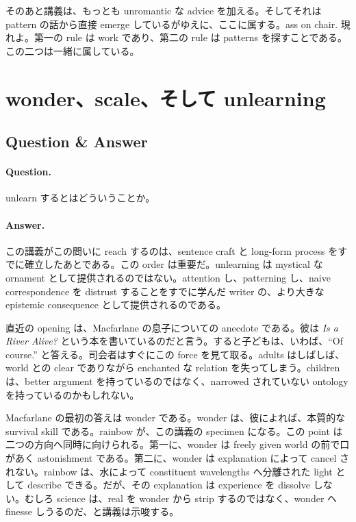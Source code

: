 そのあと講義は、もっとも unromantic な advice を加える。そしてそれは pattern の話から直接 emerge しているがゆえに、ここに属する。ass on chair. 現れよ。第一の rule は work であり、第二の rule は patterns を探すことである。この二つは一緒に属している。

\section{wonder、scale、そして unlearning}

\subsection{Question \& Answer}

\paragraph{Question.} unlearn するとはどういうことか。

\paragraph{Answer.} この講義がこの問いに reach するのは、sentence craft と long-form process をすでに確立したあとである。この order は重要だ。unlearning は mystical な ornament として提供されるのではない。attention し、patterning し、naive correspondence を distrust することをすでに学んだ writer の、より大きな epistemic consequence として提供されるのである。

直近の opening は、Macfarlane の息子についての anecdote である。彼は \emph{Is a River Alive?} という本を書いているのだと言う。すると子どもは、いわば、``Of course.'' と答える。司会者はすぐにこの force を見て取る。adults はしばしば、world との clear でありながら enchanted な relation を失ってしまう。children は、better argument を持っているのではなく、narrowed されていない ontology を持っているのかもしれない。

Macfarlane の最初の答えは wonder である。wonder は、彼によれば、本質的な survival skill である。rainbow が、この講義の specimen になる。この point は二つの方向へ同時に向けられる。第一に、wonder は freely given world の前で口があく astonishment である。第二に、wonder は explanation によって cancel されない。rainbow は、水によって constituent wavelengths へ分離された light として describe できる。だが、その explanation は experience を dissolve しない。むしろ science は、real を wonder から strip するのではなく、wonder へ finesse しうるのだ、と講義は示唆する。


